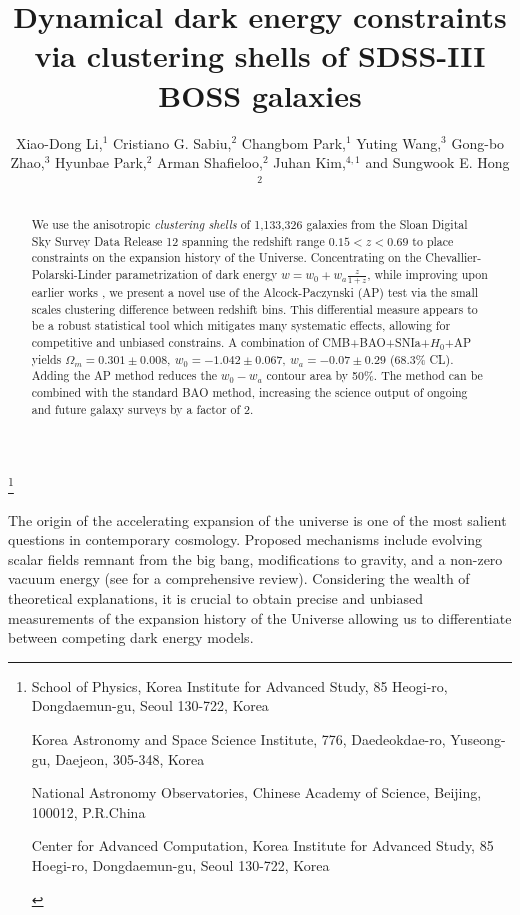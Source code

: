\documentclass{natureprintstyle}
\title{%
Dynamical dark energy constraints via clustering shells of SDSS-III BOSS galaxies}
\author{%
Xiao-Dong Li,$^{1}$
Cristiano G. Sabiu,$^{2}$
Changbom Park,$^{1}$
Yuting Wang,$^{3}$
Gong-bo Zhao,$^{3}$
Hyunbae Park,$^{2}$
Arman Shafieloo,$^{2}$
Juhan Kim,$^{4,1}$
and Sungwook E. Hong$^{2}$}
\let\citep\cite
\begin{document}
\maketitle
\let\thefootnote\relax\footnote{


\begin{affiliations}
  \item School of Physics, Korea Institute for Advanced Study, 85 Heogi-ro, Dongdaemun-gu, Seoul 130-722, Korea
  \item Korea Astronomy and Space Science Institute, 776, Daedeokdae-ro, Yuseong-gu, Daejeon, 305-348, Korea
  \item National Astronomy Observatories, Chinese Academy of Science, Beijing, 100012, P.R.China
  \item Center for Advanced Computation, Korea Institute for Advanced Study, 85 Hoegi-ro, Dongdaemun-gu, Seoul 130-722, Korea
\end{affiliations}
}

\vspace{-3.5mm}
\begin{abstract}
We use the anisotropic {\itshape clustering shells} of 1,133,326 galaxies from the Sloan Digital Sky Survey Data Release 
12 spanning the redshift range  $0.15<z<0.69$ to place constraints on the expansion history of the Universe. 
Concentrating on the Chevallier-Polarski-Linder parametrization of dark energy $w=w_0+w_a\frac{z}{1+z}$,
while improving upon earlier works \citep{Li2016}, 
we present a novel use of the Alcock-Paczynski (AP) test via the small scales clustering difference between redshift bins. 
This differential measure appears to be a robust statistical tool which mitigates many systematic effects, 
allowing for competitive and unbiased constrains. 
A combination of CMB+BAO+SNIa+$H_0$+AP yields
$\Omega_m = 0.301 \pm 0.008,\ w_0 = -1.042 \pm 0.067,\ w_a = -0.07 \pm 0.29$ (68.3\% CL).
Adding the AP method reduces the $w_0-w_a$ contour area by 50\%.
The method can be combined with the standard BAO method, 
increasing the science output of ongoing and future galaxy surveys by a factor of 2.
\end{abstract}

The  origin  of  the  accelerating  expansion  of  the  universe  is  one of  the  most  salient  questions  in  contemporary cosmology. 
Proposed mechanisms include  evolving  scalar  fields  remnant  from  the  big  bang, 
modifications to gravity,  and a  non-zero  vacuum energy (see \cite{2012IJMPD..2130002Y} for a comprehensive review). 
Considering the wealth of theoretical explanations, it is crucial to obtain precise and unbiased measurements of the expansion history of the Universe allowing us to 
differentiate between competing dark energy models.
\end{document}
